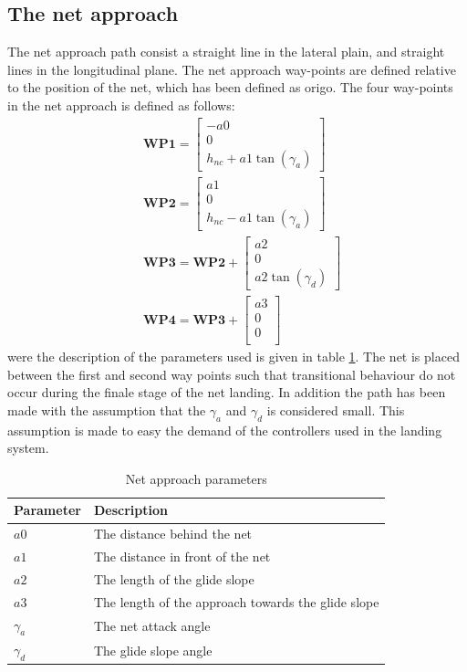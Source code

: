 \subsection{The net approach}
The net approach path consist a straight line in the lateral plain, and straight lines in the longitudinal plane. The net approach way-points are defined relative to the position of the net, which has been defined as origo. The four way-points in the net approach is defined as follows:
\begin{subequations}
\begin{align}
&\mathbf{WP1} = 
\begin{bmatrix}
-a0 \\
0 \\
h_{nc} + a1\tan(\gamma_a) 
\end{bmatrix}\\
&\mathbf{WP2} = 
\begin{bmatrix}
a1 \\
0 \\
h_{nc} - a1\tan(\gamma_a)
\end{bmatrix}\\
&\mathbf{WP3} = \mathbf{WP2} + 
\begin{bmatrix}
a2 \\
0 \\
a2\tan(\gamma_d)
\end{bmatrix}\\
&\mathbf{WP4} = \mathbf{WP3} + 
\begin{bmatrix}
a3 \\
0 \\
0 \\
\end{bmatrix}
\end{align}
\end{subequations}
were the description of the parameters used is given in table \ref{Tb:Approach Parameters}. The net is placed between the first and second way points such that transitional behaviour do not occur during the finale stage of the net landing. In addition the path has been made with the assumption that the $\gamma_a$ and $\gamma_d$ is considered small. This assumption is made to easy the demand of the controllers used in the landing system.
\begin{table}[H]
\begin{center}
    \begin{tabular}{ | l | l |}
    \hline
    \textbf{Parameter} & \textbf{Description} \\ \hline
    $a0$ & The distance behind the net \\ \hline
    $a1$ & The distance in front of the net \\ \hline
    $a2$ & The length of the glide slope \\ \hline
    $a3$ & The length of the approach towards the glide slope \\ \hline
    $\gamma_a$ & The net attack angle \\ \hline
    $\gamma_d$ & The glide slope angle \\ \hline
    \end{tabular}
\end{center}
\caption{Net approach parameters }
\label{Tb:Approach Parameters}
\end{table}
